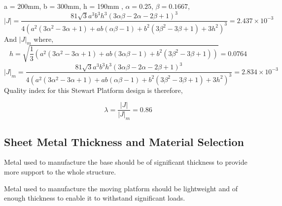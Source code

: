 a = 200mm, b = 300mm, h = 190mm , $\alpha = 0.25$, $ \beta = 0.1667$,
\begin{equation*}
|J| =
\frac{81 \sqrt{3} a^3 b^3 h^3 (3 \alpha \beta - 2 \alpha - 2 \beta +1)^3}{4(a^2(3 \alpha^2 - 3 \alpha + 1)+ ab(\alpha \beta - 1 )+ b^2(3 \beta^2 - 3 \beta + 1)+ 3h^2)^3} = 2.437 \times 10^{-3}
\label{eq:myeqn}
\end{equation*}
And $ |J|_{m}$ where,
\begin{equation}
h = \sqrt{\frac{1}{3}(a^2 (3 \alpha^2 - 3 \alpha + 1)+ ab (3\alpha\beta - 1)+b^2(3 \beta^2 - 3 \beta + 1))} = 0.0764
\label{eq:myeqn}
\end{equation}
\begin{equation*}
|J|_{m} =
\frac{81 \sqrt{3} a^3 b^3 h^3 (3 \alpha \beta - 2 \alpha - 2 \beta +1)^3}{4(a^2(3 \alpha^2 - 3 \alpha + 1)+ ab(\alpha \beta - 1 )+ b^2(3 \beta^2 - 3 \beta + 1)+ 3h^2)^3} = 2.834 \times 10^{-3}
\label{eq:myeqn}
\end{equation*}
Quality index for this Stewart Platform design is therefore, 

$$\lambda = \frac{|J|}{|J|_{m}} = 0.86$$
\subsection{Sheet Metal Thickness and Material Selection}
Metal used to manufacture the base should be of significant thickness to provide more support to the whole structure.

Metal used to manufacture the moving platform should be lightweight and of enough thickness to enable it to withstand significant loads.

